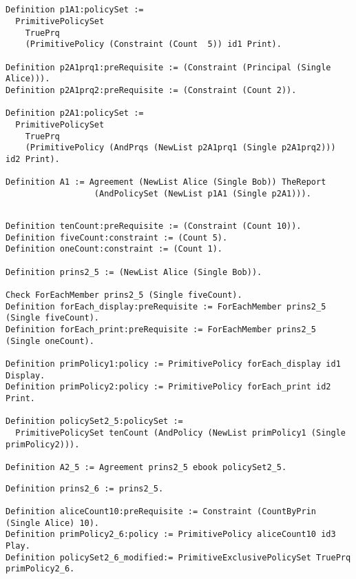 \lstset{language=Coq}
\begin{minipage}[c]{0.95\textwidth}
\begin{lstlisting}[frame=single, caption={Agreement 2.1 in Coq},label={lst:example21}]


Definition p1A1:policySet :=
  PrimitivePolicySet
    TruePrq
    (PrimitivePolicy (Constraint (Count  5)) id1 Print).

Definition p2A1prq1:preRequisite := (Constraint (Principal (Single Alice))).
Definition p2A1prq2:preRequisite := (Constraint (Count 2)).

Definition p2A1:policySet :=
  PrimitivePolicySet
    TruePrq
    (PrimitivePolicy (AndPrqs (NewList p2A1prq1 (Single p2A1prq2))) id2 Print).

Definition A1 := Agreement (NewList Alice (Single Bob)) TheReport
                  (AndPolicySet (NewList p1A1 (Single p2A1))).

\end{lstlisting}                  
\end{minipage}



\lstset{language=Coq}
\begin{lstlisting}[frame=single, caption={Example 2.5},label={lst:example25}]

Definition tenCount:preRequisite := (Constraint (Count 10)).
Definition fiveCount:constraint := (Count 5).
Definition oneCount:constraint := (Count 1).

Definition prins2_5 := (NewList Alice (Single Bob)).

Check ForEachMember prins2_5 (Single fiveCount).
Definition forEach_display:preRequisite := ForEachMember prins2_5 (Single fiveCount).
Definition forEach_print:preRequisite := ForEachMember prins2_5 (Single oneCount).

Definition primPolicy1:policy := PrimitivePolicy forEach_display id1 Display.
Definition primPolicy2:policy := PrimitivePolicy forEach_print id2 Print.

Definition policySet2_5:policySet :=
  PrimitivePolicySet tenCount (AndPolicy (NewList primPolicy1 (Single primPolicy2))).
                     
Definition A2_5 := Agreement prins2_5 ebook policySet2_5.

\end{lstlisting}


\lstset{language=Coq}
\begin{lstlisting}[frame=single, caption={Example 2.6},label={lst:example26}]
Definition prins2_6 := prins2_5.

Definition aliceCount10:preRequisite := Constraint (CountByPrin (Single Alice) 10).
Definition primPolicy2_6:policy := PrimitivePolicy aliceCount10 id3 Play.
Definition policySet2_6_modified:= PrimitiveExclusivePolicySet TruePrq primPolicy2_6.
\end{lstlisting}


